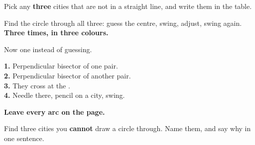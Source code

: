 \documentclass[12pt,a4paper]{article}
\begin{document}
\begin{minipage}[t]{8.2cm}
  \vspace{0pt}

  \begin{tcolorbox}[sidebox, colback=cbpurple!6, colframe=cbpurple,
                    coltitle=cbpurple, title={Task 1 \textemdash{} by eye}]
    Pick any \textbf{three} cities that are not in a straight line, and write
    them in the table.

    Find the circle through all three: guess the centre, swing, adjust, swing
    again. \textbf{Three times, in three colours.}
  \end{tcolorbox}

  \begin{tcolorbox}[sidebox, colback=cborange!6, colframe=cborange,
                    coltitle=cborange, title={Task 2 \textemdash{} properly}]
    Now  one instead of guessing.

    \textbf{1.} Perpendicular bisector of one pair.\\
    \textbf{2.} Perpendicular bisector of another pair.\\
    \textbf{3.} They cross at the .\\
    \textbf{4.} Needle there, pencil on a city, swing.

    \textbf{Leave every arc on the page.}
  \end{tcolorbox}

  \begin{tcolorbox}[sidebox, colback=cbgreen!7, colframe=cbgreen,
                    coltitle=cbgreen!75!black, title={Challenge}]
    Find three cities you \textbf{cannot} draw a circle through. Name them, and
    say why in one sentence.

    \vspace{1pt}
    \blank[7.1cm]

    \vspace{3pt}
    \blank[7.1cm]
  \end{tcolorbox}
\end{minipage}

\vspace{6pt}
\end{document}
